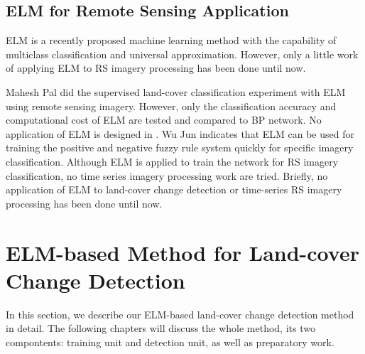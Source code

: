 \documentclass{elsart}
\begin{document}
\subsection{ELM for Remote Sensing Application}
ELM is a recently proposed machine learning method with the capability of multiclass classification and universal approximation\cite{Huang2012}\cite{Huang2000}\cite{Zhang2007}\cite{Huang2006}.
However, only a little work of applying ELM to RS imagery processing has been done until now. 
\par
Mahesh Pal\cite{Pal2008} did the supervised land-cover classification experiment with ELM using remote sensing imagery.
However, only the classification accuracy and computational cost of ELM are tested and compared to BP network.
No application of ELM is designed in \cite{Pal2008}.
Wu Jun\cite{Jun2011} indicates that ELM can be used for training the positive and negative fuzzy rule system quickly for specific imagery classification.
Although ELM is applied to train the network for RS imagery classification, no time series imagery processing work are tried.
Briefly, no application of ELM to land-cover change detection or time-series RS imagery processing has been done until now. 


\section{ELM-based Method for Land-cover Change Detection}
In this section, we describe our ELM-based land-cover change detection method in detail.
The following chapters will discuss the whole method, its two compontents: training unit and detection unit, as well as preparatory work.
\end{document}
